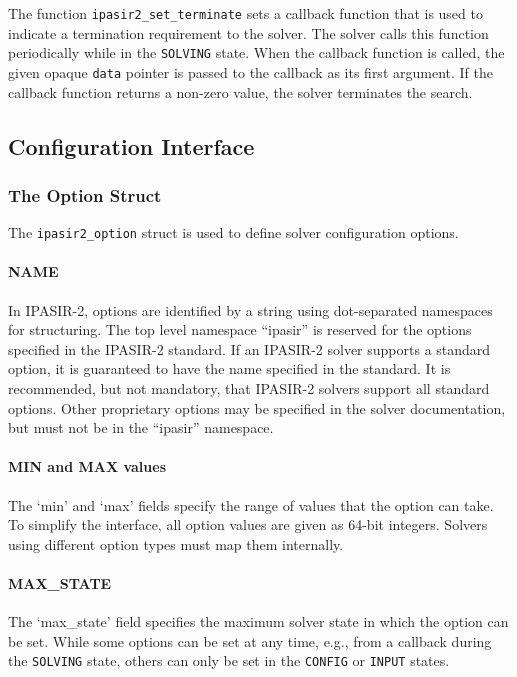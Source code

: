 \documentclass[sat]{iosart2x}
\begin{document}
The function \texttt{ipasir2\_set\_terminate} sets a callback function that is used to indicate a termination requirement to the solver.
The solver calls this function periodically while in the \texttt{SOLVING} state.
When the callback function is called, the given opaque \texttt{data} pointer is passed to the callback as its first argument.
If the callback function returns a non-zero value, the solver terminates the search.

\subsection{Configuration Interface}

\subsubsection{The Option Struct}

The \texttt{ipasir2\_option} struct is used to define solver configuration options.

\paragraph{NAME}
In IPASIR-2, options are identified by a string using dot-separated namespaces for structuring.
The top level namespace ``ipasir'' is reserved for the options specified in the IPASIR-2 standard.
If an IPASIR-2 solver supports a standard option, it is guaranteed to have the name specified in the standard.
It is recommended, but not mandatory, that IPASIR-2 solvers support all standard options.
Other proprietary options may be specified in the solver documentation, but must not be in the ``ipasir'' namespace.

\paragraph{MIN and MAX values}
The `min' and `max' fields specify the range of values that the option can take.
To simplify the interface, all option values are given as 64-bit integers.
Solvers using different option types must map them internally.

\paragraph{MAX\_STATE}
The `max\_state' field specifies the maximum solver state in which the option can be set.
While some options can be set at any time, e.g., from a callback during the \texttt{SOLVING} state, others can only be set in the \texttt{CONFIG} or \texttt{INPUT} states.
\end{document}
